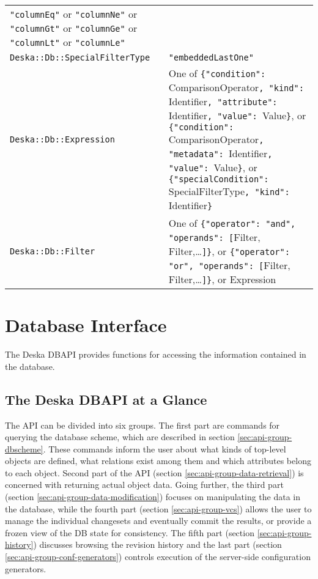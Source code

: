 \documentclass{article}
\begin{document}
\begin{longtable}{ p{60mm} p{90mm} }
        {\tt "columnEq"} or {\tt "columnNe"} or {\tt "columnGt"} or {\tt "columnGe"} or {\tt "columnLt"} or
        {\tt "columnLe"}
        \\
    {\tt Deska::Db::SpecialFilterType} &
        {\tt "embeddedLastOne"}
        \\
    {\tt Deska::Db::Expression} &
        One of \newline
        {\tt \{"condition": }ComparisonOperator{\tt, "kind": }Identifier{\tt, "attribute": }Identifier{\tt, "value":
        }Value{\tt \}}, \newline
        or \newline
        {\tt \{"condition": }ComparisonOperator{\tt, "metadata": }Identifier{\tt, "value": }Value{\tt \}}, \newline
        or \newline
        {\tt \{"specialCondition": }SpecialFilterType{\tt, "kind": }Identifier{\tt \}}
        \\
    {\tt Deska::Db::Filter} &
        One of \newline
        {\tt \{"operator": "and", "operands": [}Filter, Filter,\ldots{\tt]\}}, \newline
        or \newline
        {\tt \{"operator": "or", "operands": [}Filter, Filter,\ldots{\tt]\}}, \newline
        or \newline
        Expression

\end{longtable}

\section{Database Interface}

The Deska DBAPI provides functions for accessing the information contained in the database.

\subsection{The Deska DBAPI at a Glance}

The API can be divided into six groups.  The first part are commands for querying the database scheme, which are
described in section \ref{sec:api-group-dbscheme}.  These commands inform the user about what kinds of top-level objects are
defined, what relations exist among them and which attributes belong to each object.  Second part of the API
(section \ref{sec:api-group-data-retrieval}) is concerned with returning actual object data.  Going further, the third
part (section \ref{sec:api-group-data-modification}) focuses on manipulating the data in the database, while the fourth
part (section \ref{sec:api-group-vcs}) allows the user to manage the individual changesets and eventually commit the
results, or provide a frozen view of the DB state for consistency.  The fifth part (section \ref{sec:api-group-history})
discusses browsing the revision history and the last part (section \ref{sec:api-group-conf-generators}) controls
execution of the server-side configuration generators.
\end{document}
